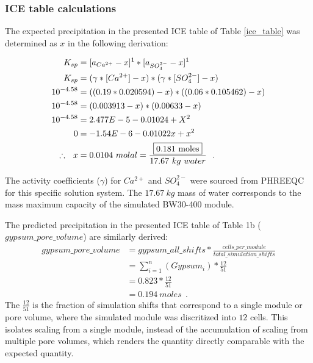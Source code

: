 \begin{supplementary}
\subsubsection{ICE table calculations}
The expected precipitation in the presented ICE table of Table \ref{ice_table} was determined as $x$ in the following derivation:

\begin{equation} \label{ice_calculations}
    \begin{split}
        K_{sp} &= [a_{Ca^{2+}} - x]^1 * [a_{SO_4^{2-}} - x]^1 \\ 
        K_{sp} &= (\gamma*[Ca^{2+}] - x) * (\gamma*[SO_4^{2-}] - x) \\ 
        10^{-4.58} &= ((0.19*0.020594) - x) * ((0.06*0.105462) - x) \\ 
        10^{-4.58} &= (0.003913 - x) * (0.00633 - x) \\
        10^{-4.58} &= 2.477E-5 - 0.01024 + X^2 \\
        0 &= -1.54E-6 - 0.01022x + x^2 \\
         \therefore ~~ x &= 0.0104~molal = \frac{\fbox{0.181~moles}}{17.67~kg~water}~~.
    \end{split}
\end{equation}

The activity coefficients ($\gamma$) for $Ca^{2+}$ and $SO_4^{2-}$ were sourced from PHREEQC for this specific solution system. The $17.67~kg$ mass of water corresponds to the mass maximum capacity of the simulated BW30-400 module.  

The predicted precipitation in the presented ICE table of Table 1b ($gypsum\_pore\_volume$) are similarly derived:
\begin{equation} \label{PHREEQC_output_precipitation}
    \begin{split}
        gypsum\_pore\_volume &= gypsum\_all\_shifts * \frac{cells\_per\_module}{total\_simulation\_shifts} \\
         &= \sum_{i=1}^n (Gypsum_i) * \frac{12}{51} \\ 
         &= 0.823 * \frac{12}{51} \\ 
         &= 0.194 ~moles ~~.
    \end{split}
\end{equation}
The $\frac{12}{51}$ is the fraction of simulation shifts that correspond to a single module or pore volume, where the simulated module was discritized into $12$ cells. This isolates scaling from a single module, instead of the accumulation of scaling from multiple pore volumes, which renders the quantity directly comparable with the expected quantity.


\end{supplementary}
